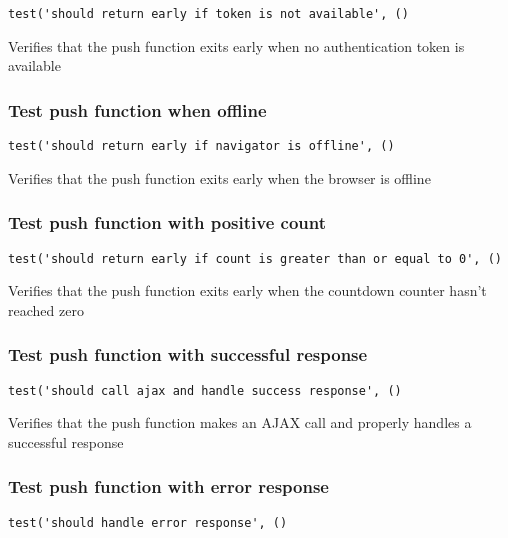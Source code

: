 \documentclass[a4paper]{article}
\begin{document}
\begin{lstlisting}
test('should return early if token is not available', ()
\end{lstlisting}

Verifies that the push function exits early when no authentication
token is available

\hypertarget{toc249}{}
\subsubsection{Test push function when offline}

\begin{lstlisting}
test('should return early if navigator is offline', ()
\end{lstlisting}

Verifies that the push function exits early when the browser
is offline

\hypertarget{toc250}{}
\subsubsection{Test push function with positive count}

\begin{lstlisting}
test('should return early if count is greater than or equal to 0', ()
\end{lstlisting}

Verifies that the push function exits early when the countdown
counter hasn't reached zero

\hypertarget{toc251}{}
\subsubsection{Test push function with successful response}

\begin{lstlisting}
test('should call ajax and handle success response', ()
\end{lstlisting}

Verifies that the push function makes an AJAX call and properly
handles a successful response

\hypertarget{toc252}{}
\subsubsection{Test push function with error response}

\begin{lstlisting}
test('should handle error response', ()
\end{lstlisting}
\end{document}
